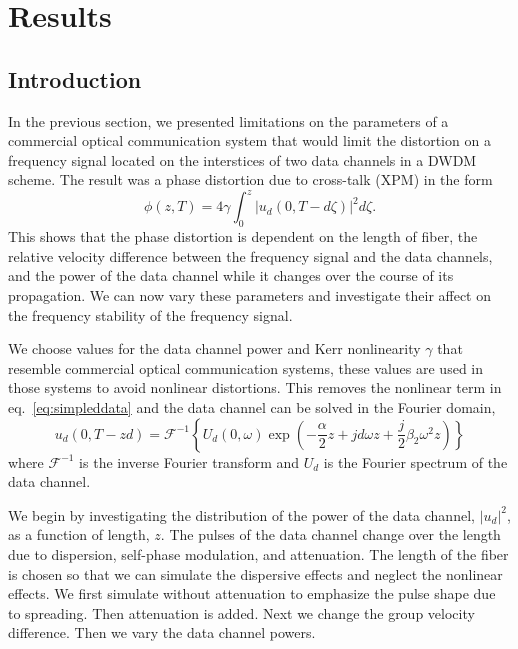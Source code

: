 \chapter{Results}
\label{chap:results}

\section{Introduction}

In the previous section, we presented limitations on the parameters of a commercial optical communication system that would limit the distortion on a frequency signal located on the interstices of two data channels in a DWDM scheme. The result was a phase distortion due to cross-talk (XPM) in the form
%
\begin{equation}
\phi(z,T) = 4\gamma\int_0^z |u_d(0, T-d\zeta)|^2 d\zeta.
\end{equation}
%
This shows that the phase distortion is dependent on the length of fiber, the relative velocity difference between the frequency signal and the data channels, and the power of the data channel while it changes over the course of its propagation. We can now vary these parameters and investigate their affect on the frequency stability of the frequency signal.

We choose values for the data channel power and Kerr nonlinearity $\gamma$ that resemble commercial optical communication systems, these values are used in those systems to avoid nonlinear distortions. This removes the nonlinear term in eq.~\ref{eq:simpleddata} and the data channel can be solved in the Fourier domain,
%
\begin{equation} \label{eq:datasol}
u_d(0,T-zd) = \mathcal{F}^{-1} \left\{ U_d(0, \omega)\exp\left(-\frac{\alpha}{2} z + jd\omega z + \frac{j}{2}\beta_2\omega^2z\right) \right\}
\end{equation}
%
where $\mathcal{F}^{-1}$ is the inverse Fourier transform and $U_d$ is the Fourier spectrum of the data channel.

We begin by investigating the distribution of the power of the data channel, $|u_d|^2$, as a function of length, $z$. The pulses of the data channel change over the length due to dispersion, self-phase modulation, and attenuation. The length of the fiber is chosen so that we can simulate the dispersive effects and neglect the nonlinear effects. We first simulate without attenuation to emphasize the pulse shape due to spreading. Then attenuation is added. Next we change the group velocity difference. Then we vary the data channel powers.

